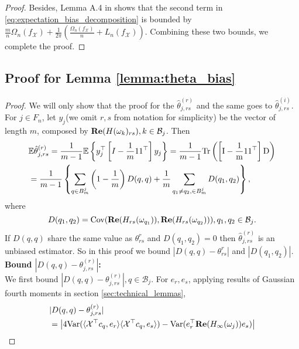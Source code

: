 \begin{proof}
Besides, Lemma A.4 in \cite{sun2018large} shows that the second term in \eqref{eq:expectation_bias_decomposition} is bounded by $\frac{m}{n}\Omega_n(f_\mathcal{X}) + \frac{1}{2\pi}\left(\frac{\Omega_n(f_\mathcal{X})}{n}+L_n(f_\mathcal{X})\right)$. Combining these two bounds, we complete the proof. 
 \end{proof}
 
\subsection{Proof for Lemma \ref{lemma:theta_bias}} 
\begin{proof}
We will only show that the proof for the $\hat{\theta}^{(r)}_{j,rs}$ and the same goes to
$\hat{\theta}^{(i)}_{j,rs}$.
For $j\in F_n$, let $y_j$(we omit $r,s$ from notation for simplicity) be the vector of length $m$, composed by  ${\bf Re}(H(\omega_k)_{rs}), k\in \mathcal{B}_j$. Then 
\begin{equation}
\begin{aligned}
&\mathbb{E} \hat{\theta}^{(r)}_{j,rs} = \frac{1}{m-1}\mathbb{E}\left\{y_j^\top   \left[I-\frac{1}{m}11^\top   \right]y_j\right\} = \frac{1}{m-1}\rm{Tr}\left(\left[I-\frac{1}{m}11^\top   \right] D\right) \\
&= \frac{1}{m-1}\left\{\sum_{q\in B^j_m} \left(1-\frac{1}{m}\right)D(q,q) + \frac{1}{m} \sum_{q_1\neq q_2, \in B^j_m}D(q_1,q_2)\right\}, 
\end{aligned}
\end{equation}
where 
\begin{equation}
D(q_1,q_2) = \mbox{Cov}({\bf Re}(H_{rs}(\omega_{q_1})), {\bf Re}(H_{rs}(\omega_{q_2}))), q_1,q_2 \in \mathcal{B}_j.
\end{equation}
If $D(q,q)$ share the same value as $\theta^r_{rs}$ and $D(q_1,q_2)=0$ then $\hat{\theta}^{(r)}_{j,rs}$ is an unbiased estimator. So in this proof we bound  
$|D(q,q) - \theta^r_{rs}|$ and $|D(q_1,q_2)|$.\\[0.2cm]
{\bf Bound $|D(q,q) - \theta^{(r)}_{j, rs}|$:}\\
We first bound  $|D(q,q)-\theta^{(r)}_{j, rs}|, q\in \mathcal{B}_j$. 
For $e_r, e_s$, applying results of Gaussian fourth moments in section \ref{sec:technical_lemmas}, 
\begin{equation}
\label{eq: dif_liminting_var}
\begin{aligned}
&|D(q,q)-\theta^{(r)}_{j, rs}| \\
&=  \left|4\var(\langle \mathcal{X}^\top   c_q,e_r\rangle \langle \mathcal{\mathcal{X}}^\top   c_q,e_s\rangle) - \var(e_r^\top  {\bf Re}(H_{\infty}(\omega_j))e_s)\right| \\

\end{aligned}
\end{equation}
\end{proof}
